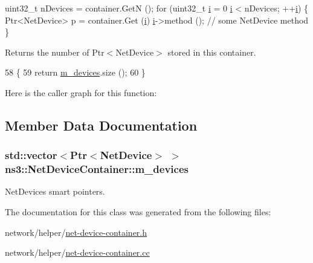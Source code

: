 \begin{DoxyCode}
uint32\_t nDevices = container.GetN ();
\textcolor{keywordflow}{for} (uint32\_t \hyperlink{bernuolliDistribution_8m_a6f6ccfcf58b31cb6412107d9d5281426}{i} = 0 \hyperlink{bernuolliDistribution_8m_a6f6ccfcf58b31cb6412107d9d5281426}{i} < nDevices; ++\hyperlink{bernuolliDistribution_8m_a6f6ccfcf58b31cb6412107d9d5281426}{i})
  \{
    Ptr<NetDevice> p = container.Get (\hyperlink{bernuolliDistribution_8m_a6f6ccfcf58b31cb6412107d9d5281426}{i})
    \hyperlink{bernuolliDistribution_8m_a6f6ccfcf58b31cb6412107d9d5281426}{i}->method ();  \textcolor{comment}{// some NetDevice method}
  \}
\end{DoxyCode}


\begin{DoxyReturn}{Returns}
the number of Ptr$<$\+Net\+Device$>$ stored in this container. 
\end{DoxyReturn}

\begin{DoxyCode}
58 \{
59   \textcolor{keywordflow}{return} \hyperlink{classns3_1_1NetDeviceContainer_a843312c4f3c05e66de261e799e1a835f}{m\_devices}.size ();
60 \}
\end{DoxyCode}


Here is the caller graph for this function\+:




\subsection{Member Data Documentation}
\subsubsection[{\texorpdfstring{m\+\_\+devices}{m_devices}}]{\setlength{\rightskip}{0pt plus 5cm}std\+::vector$<${\bf Ptr}$<${\bf Net\+Device}$>$ $>$ ns3\+::\+Net\+Device\+Container\+::m\+\_\+devices\hspace{0.3cm}{\ttfamily [private]}}\hypertarget{classns3_1_1NetDeviceContainer_a843312c4f3c05e66de261e799e1a835f}{}\label{classns3_1_1NetDeviceContainer_a843312c4f3c05e66de261e799e1a835f}


Net\+Devices smart pointers. 



The documentation for this class was generated from the following files\+:\begin{DoxyCompactItemize}
\item 
network/helper/\hyperlink{net-device-container_8h}{net-\/device-\/container.\+h}\item 
network/helper/\hyperlink{net-device-container_8cc}{net-\/device-\/container.\+cc}\end{DoxyCompactItemize}
